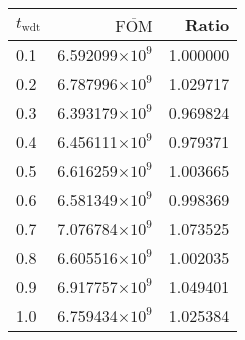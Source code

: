 \begin{tabular}{lrr}
\toprule
$t_{\mathrm{wdt}}$ & $\overline{\mathrm{FOM}}$ &    Ratio \\
\midrule
               0.1 &   6.592099$\times 10^{9}$ & 1.000000 \\
               0.2 &   6.787996$\times 10^{9}$ & 1.029717 \\
               0.3 &   6.393179$\times 10^{9}$ & 0.969824 \\
               0.4 &   6.456111$\times 10^{9}$ & 0.979371 \\
               0.5 &   6.616259$\times 10^{9}$ & 1.003665 \\
               0.6 &   6.581349$\times 10^{9}$ & 0.998369 \\
               0.7 &   7.076784$\times 10^{9}$ & 1.073525 \\
               0.8 &   6.605516$\times 10^{9}$ & 1.002035 \\
               0.9 &   6.917757$\times 10^{9}$ & 1.049401 \\
               1.0 &   6.759434$\times 10^{9}$ & 1.025384 \\
\bottomrule
\end{tabular}
